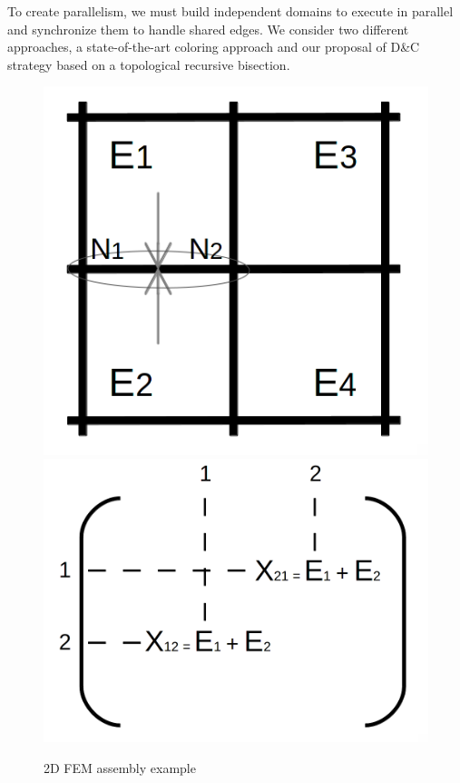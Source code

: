 \documentclass[10pt]{IOS-Book-Article}
\begin{document}
To create parallelism, we must build independent domains to execute in parallel and synchronize them to handle shared edges.
We consider two different approaches, a state-of-the-art coloring approach and our proposal of D\&C strategy based on a topological recursive bisection.
\begin{figure}[htp]
 \centering
 \includegraphics[scale=0.2]{2D_asm.png}
 \includegraphics[scale=0.12]{Matrix_asm.png}
 \caption{2D FEM assembly example}
 \label{fig:2Dasm}
\end{figure}
\end{document}
